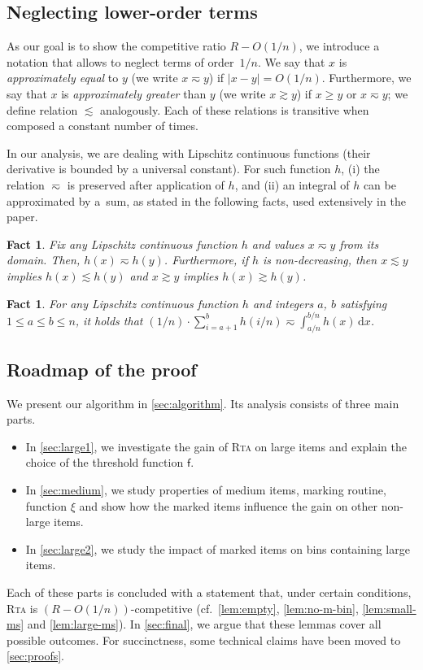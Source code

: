 \documentclass[a4paper,USenglish,cleveref]{lipics-v2019}
\newtheorem{fact}[theorem]{Fact}
\newcommand{\R}{\ensuremath{R}}
\newcommand{\f}{\textsf{f}}
\newcommand{\g}{\ensuremath{\xi}}
\newcommand{\dd}{\mathrm{d}}
\newcommand{\ALG}{\textsc{Rta}\xspace}
\begin{document}
\subsection{Neglecting lower-order terms}

As our goal is to show the competitive ratio $\R - O(1/n)$, we introduce a
notation that allows to neglect terms of order~$1/n$. We say that $x$ is
\emph{approximately equal} to $y$ (we write $x \eqsim y$) if $|x - y| = O(1/n)$.
Furthermore, we say that $x$ is \emph{approximately greater} than $y$ (we write
$x \gtrsim y$) if $x \geq y$ or $x \eqsim y$; we define relation $\lesssim$
analogously. Each of these relations is transitive when composed a
constant number of times.

In our analysis, we are dealing with Lipschitz continuous functions 
(their derivative is bounded by a universal constant). For such function $h$, 
(i) the relation $\eqsim$ is preserved after application of $h$, and (ii) 
an integral of $h$ can be approximated by a~sum, as stated in the following facts,
used extensively in the paper.

\begin{fact}
\label{lem:Lipschitz}
Fix any Lipschitz continuous function $h$ and values $x \eqsim y$ from its domain. 
Then, $h(x) \eqsim h(y)$. Furthermore, if $h$ is non-decreasing, then
$x \lesssim y$ implies $h(x) \lesssim h(y)$
and $x \gtrsim y$ implies $h(x) \gtrsim h(y)$.
\end{fact}

\begin{fact}
\label{lem:sum_int}
For any Lipschitz continuous function $h$ and integers $a$, $b$ satisfying $1
\leq a \leq b \leq n$, it holds that $(1/n) \cdot \sum_{i=a+1}^b h(i/n) \eqsim
\int_{a/n}^{b/n} h(x)\, \dd x$.
\end{fact}


\subsection{Roadmap of the proof}

We present our algorithm in \cref{sec:algorithm}. 
Its analysis consists of three main parts. 
\begin{itemize}
\item In \cref{sec:large1}, we investigate the gain of \ALG on large items and explain
the choice of the threshold function $\f$. 
\item In \cref{sec:medium}, we study properties of medium items, marking 
routine, function $\g$ and show how the marked items influence the gain 
on other non-large items. 
\item In \cref{sec:large2}, we study the impact of marked items on 
bins containing large items. 
\end{itemize}
Each of these parts is concluded with a statement that, under certain
conditions, \ALG is $(R-O(1/n))$-competitive (cf.~\cref{lem:empty},
\cref{lem:no-m-bin}, \cref{lem:small-ms} and \cref{lem:large-ms}). In
\cref{sec:final}, we argue that these lemmas cover all possible outcomes. For
succinctness, some technical claims have been moved to \cref{sec:proofs}.
\end{document}
